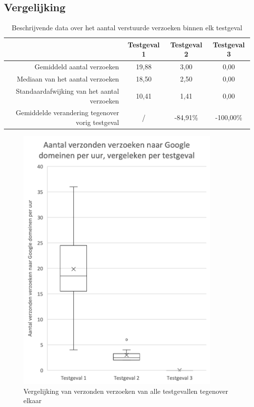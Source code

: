 \subsection{Vergelijking}

\begin{table}[]
    \centering
    \begin{tabular}{@{}rccc@{}}
        \toprule
        & Testgeval 1 & Testgeval 2 & Testgeval 3 \\ \midrule
        Gemiddeld aantal verzoeken & 19,88 & 3,00 & 0,00 \\
        Mediaan van het aantal verzoeken & 18,50 & 2,50 & 0,00 \\
        Standaardafwijking van het aantal verzoeken & 10,41 & 1,41 & 0,00 \\
        Gemiddelde verandering tegenover vorig testgeval & / & -84,91\% & -100,00\% \\ \bottomrule
    \end{tabular}
    \caption{Beschrijvende data over het aantal verstuurde verzoeken binnen elk testgeval}
    \label{tab:misc-data}
\end{table}

\begin{figure}
    \centering
    \includegraphics[width=0.9\textwidth]{experiment/grafieken/boxplot-compare.png}
    \caption{Vergelijking van verzonden verzoeken van alle testgevallen tegenover elkaar}
    \label{fig:boxplot-compare}
\end{figure}

